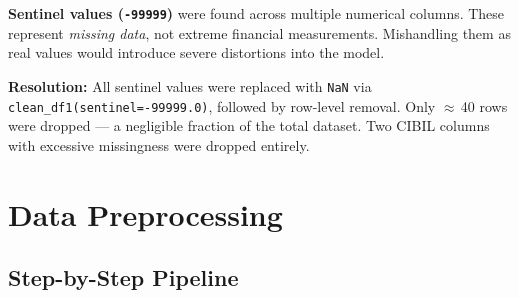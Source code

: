 \documentclass[12pt,a4paper]{article}
\begin{document}
\begin{warnbox}
  \textbf{Sentinel values (\texttt{-99999})} were found across multiple numerical
  columns. These represent \emph{missing data}, not extreme financial measurements.
  Mishandling them as real values would introduce severe distortions into the model.

  \vspace{0.4em}
  \textbf{Resolution:} All sentinel values were replaced with \texttt{NaN} via
  \texttt{clean\_df1(sentinel=-99999.0)}, followed by row-level removal.
  Only $\approx$\,40 rows were dropped --- a negligible fraction of the total dataset.
  Two CIBIL columns with excessive missingness were dropped entirely.
\end{warnbox}

\newpage

\section{Data Preprocessing}

\subsection{Step-by-Step Pipeline}
\end{document}
